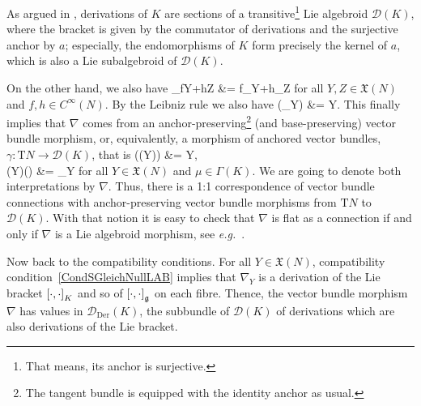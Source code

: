 \documentclass[preprint]{elsarticle}
\def\be{\begin{equation}}
\def\ee{\end{equation}}
\def\bas#1\eas{\begin{align*}#1\end{align*}}
\theoremstyle{plain}
\theoremstyle{remark}
\theoremstyle{definition}
\begin{document}
As argued in \cite[\S 3.3, Example 3.3.4; page 102f.]{mackenzieGeneralTheory}, derivations of $K$ are sections of a transitive\footnote{That means, its anchor is surjective.} Lie algebroid $\mathcal{D}(K)$, where the bracket is given by the commutator of derivations and the surjective anchor by $a$; especially, the endomorphisms of $K$ form precisely the kernel of $a$, which is also a Lie subalgebroid of $\mathcal{D}(K)$.

On the other hand, we also have
\bas
\nabla_{fY+hZ}
&=
f\nabla_Y+h\nabla_Z
\eas
for all $Y, Z \in \mathfrak{X}(N)$ and $f, h \in C^\infty(N)$. By the Leibniz rule we also have
\bas
a(\nabla_Y) &= Y.
\eas
This finally implies that $\nabla$ comes from an anchor-preserving\footnote{The tangent bundle is equipped with the identity anchor as usual.} (and base-preserving) vector bundle morphism, or, equivalently, a morphism of anchored vector bundles, $\gamma: \mathrm{T}N \to \mathcal{D}(K)$, that is
\bas
a(\gamma(Y)) &= Y, \\
\gamma(Y)(\mu)
&=
\nabla_Y \mu
\eas
for all $Y \in \mathfrak{X}(N)$ and $\mu \in \Gamma(K)$. We are going to denote both interpretations by $\nabla$. Thus, there is a 1:1 correspondence of vector bundle connections with anchor-preserving vector bundle morphisms from $\mathrm{T}N$ to $\mathcal{D}(K)$. With that notion it is easy to check that $\nabla$ is flat as a connection if and only if $\nabla$ is a Lie algebroid morphism, see \textit{e.g.}~\cite[\S 5.2, Definition 5.2.9; page 187]{mackenzieGeneralTheory}.

Now back to the compatibility conditions. For all $Y \in \mathfrak{X}(N)$, compatibility condition~\eqref{CondSGleichNullLAB} implies that $\nabla_Y$ is a derivation of the Lie bracket $\mleft[ \cdot, \cdot \mright]_K$ and so of $\mleft[ \cdot, \cdot \mright]_{\mathfrak{g}}$ on each fibre. Thence, the vector bundle morphism $\nabla$ has values in $\mathcal{D}_{\mathrm{Der}}(K)$, the subbundle of $\mathcal{D}(K)$ of derivations which are also derivations of the Lie bracket.
\end{document}
